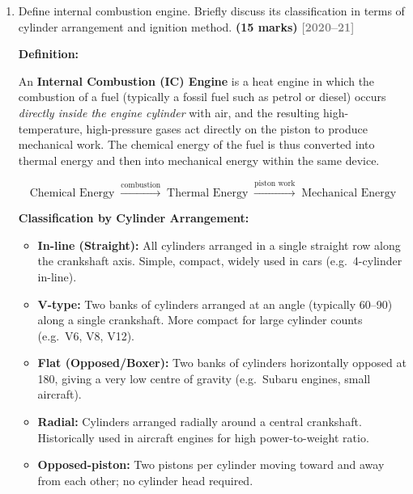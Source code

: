 \documentclass[12pt,a3paper]{article}
\newcommand{\yr}[1]{\hfill\textcolor{gray}{\small\textbf{[#1]}}}
\newcommand{\mk}[1]{\textcolor{orange!70!black}{\small\textbf{(#1 marks)}}}
\begin{document}
\begin{enumerate}
\begin{tcolorbox}[enhanced,breakable,ansbox,colback=cB!4,colframe=cB,
  boxrule=0.8pt,arc=5pt,
  title={\textbf{Answer}},fonttitle=\bfseries\color{white},colbacktitle=cB]
Net work per cycle:
\[
  W_{\text{net}} = \eta\times q_{\text{in,cycle}} = 0.6019\times375
  \approx 225.7\,\text{J/cycle}
\]

MEP:
\[
  \text{MEP} = \frac{W_{\text{net}}}{V_s}
  = \frac{225.7}{450\times10^{-6}}
  \approx \boxed{501.6\,\text{kPa}}
\]

\end{tcolorbox}
\item \label{qlabel:A2-Q5}
Define internal combustion engine. Briefly discuss its classification in terms of cylinder arrangement and ignition method. \mk{15}
\yr{2020--21}

\begin{tcolorbox}[enhanced,breakable,ansbox,colback=cB!4,colframe=cB,
  boxrule=0.8pt,arc=5pt,
  title={\textbf{Answer}},fonttitle=\bfseries\color{white},colbacktitle=cB]

\textbf{Definition:}

An \textbf{Internal Combustion (IC) Engine} is a heat engine in which the
combustion of a fuel (typically a fossil fuel such as petrol or diesel) occurs
\emph{directly inside the engine cylinder} with air, and the resulting
high-temperature, high-pressure gases act directly on the piston to produce
mechanical work. The chemical energy of the fuel is thus converted into
thermal energy and then into mechanical energy within the same device.

\[
  \text{Chemical Energy} \;\xrightarrow{\text{combustion}}\;
  \text{Thermal Energy} \;\xrightarrow{\text{piston work}}\;
  \text{Mechanical Energy}
\]

\textbf{Classification by Cylinder Arrangement:}

\begin{itemize}[leftmargin=1.5em,itemsep=3pt]
  \item \textbf{In-line (Straight):} All cylinders arranged in a single straight
        row along the crankshaft axis. Simple, compact, widely used in cars
        (e.g.\ 4-cylinder in-line).
  \item \textbf{V-type:} Two banks of cylinders arranged at an angle
        (typically 60\textdegree--90\textdegree) along a single crankshaft.
        More compact for large cylinder counts (e.g.\ V6, V8, V12).
  \item \textbf{Flat (Opposed/Boxer):} Two banks of cylinders horizontally
        opposed at 180\textdegree, giving a very low centre of gravity
        (e.g.\ Subaru engines, small aircraft).
  \item \textbf{Radial:} Cylinders arranged radially around a central
        crankshaft. Historically used in aircraft engines for high
        power-to-weight ratio.
  \item \textbf{Opposed-piston:} Two pistons per cylinder moving toward
        and away from each other; no cylinder head required.
\end{itemize}


\end{tcolorbox}
\end{enumerate}
\end{document}
